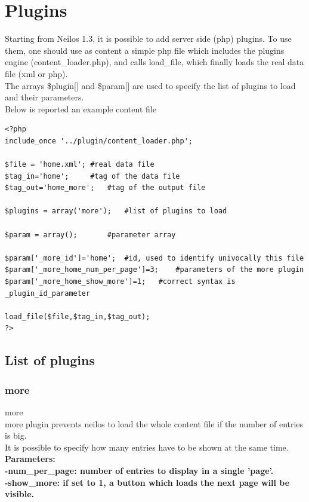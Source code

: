 \documentclass[a4paper,12pt]{article}
\begin{document}
\section{Plugins}
Starting from Neilos 1.3, it is possible to add server side (php) plugins. To use them, one should use as content a simple php file which includes the plugins engine (content\_loader.php), and calls load\_file, which finally loads the real data file (xml or php).\\
The arrays \$plugin[] and \$param[] are used to specify the list of plugins to load and their parameters.\\
Below is reported an example content file


\begin{verbatim}
<?php
include_once '../plugin/content_loader.php';

$file = 'home.xml';	#real data file
$tag_in='home';		#tag of the data file
$tag_out='home_more';	#tag of the output file

$plugins = array('more');	#list of plugins to load

$param = array();		#parameter array

$param['_more_id']='home';	#id, used to identify univocally this file
$param['_more_home_num_per_page']=3;	#parameters of the more plugin
$param['_more_home_show_more']=1;	#correct syntax is _plugin_id_parameter

load_file($file,$tag_in,$tag_out);
?>
\end{verbatim}
\subsection{List of plugins}
\subsubsection{more} more\\
more plugin prevents neilos to load the whole content file if the number of entries is big.\\
It is possible to specify how many entries have to be shown at the same time.\\
\bfseries Parameters:\\
\normalfont \normalsize -num\_per\_page: number of entries to display in a single 'page'.\\
-show\_more: if set to 1, a button which loads the next page will be visible.\\
\end{document}
